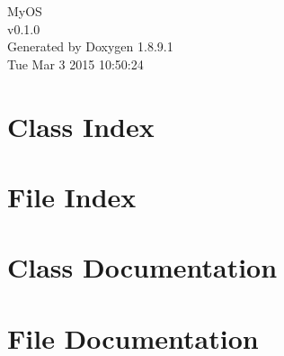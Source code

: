 \documentclass[twoside]{book}
\newcommand{\+}{\discretionary{\mbox{\scriptsize$\hookleftarrow$}}{}{}}
\newcommand{\clearemptydoublepage}{%
  \newpage{\pagestyle{empty}\cleardoublepage}%
}
\begin{document}
\hypersetup{pageanchor=false,
             bookmarks=true,
             bookmarksnumbered=true,
             pdfencoding=unicode
            }
\begin{titlepage}
\vspace*{7cm}
\begin{center}%
{\Large My\+O\+S \\[1ex]\large v0.\+1.\+0 }\\
\vspace*{1cm}
{\large Generated by Doxygen 1.8.9.1}\\
\vspace*{0.5cm}
{\small Tue Mar 3 2015 10:50:24}\\
\end{center}
\end{titlepage}
\clearemptydoublepage
\tableofcontents
\clearemptydoublepage
{}
\hypersetup{pageanchor=true}

\chapter{Class Index}

\chapter{File Index}

\chapter{Class Documentation}




























\chapter{File Documentation}




\backmatter
\newpage
{}
\clearemptydoublepage
{}
\printindex
\end{document}
